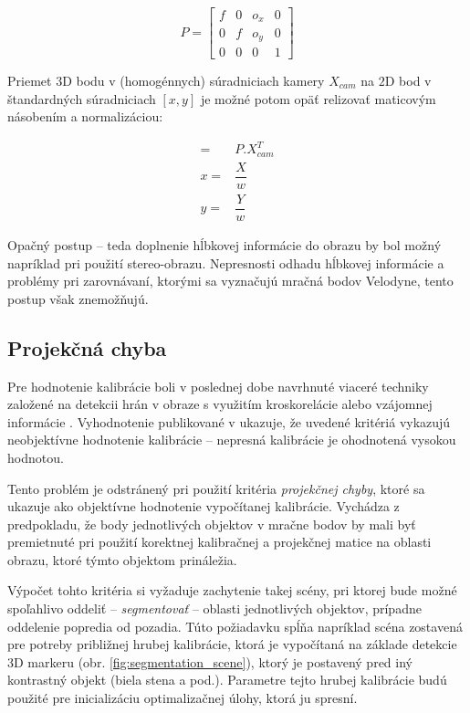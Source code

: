 \documentclass[12pt, a4paper]{article}
\begin{document}
\begin{equation}
P = \left[ 
      \begin{array}{cccc} 
	f & 0 & o_x & 0 \\
	0 & f & o_y & 0 \\ 
	0 & 0 & 0 & 1
      \end{array}
    \right]	\label{eq:projection}
\end{equation}

Priemet $3$D bodu v (homogénnych) súradniciach kamery $X_{cam}$ na $2$D bod v štandardných súradniciach $[x, y]$ je možné potom opäť relizovať maticovým násobením a normalizáciou:

\begin{eqnarray}
	[X,Y,w] =& P . X_{cam}^T \\
	x =& \dfrac{X}{w} \\
	y =& \dfrac{Y}{w}
\end{eqnarray}

Opačný postup -- teda doplnenie hĺbkovej informácie do obrazu by bol možný napríklad pri použití stereo-obrazu. Nepresnosti odhadu hĺbkovej informácie a problémy pri zarovnávaní, ktorými sa vyznačujú mračná bodov Velodyne, tento postup však znemožňujú. 

\subsection{Projekčná chyba}
Pre hodnotenie kalibrácie boli v poslednej dobe navrhnuté viaceré techniky založené na detekcii hrán v obraze s využitím kroskorelácie \cite{levinson} alebo vzájomnej informácie \cite{taylor}. Vyhodnotenie publikované v \cite{velas} ukazuje, že uvedené kritériá vykazujú neobjektívne hodnotenie kalibrácie -- nepresná kalibrácie je ohodnotená vysokou hodnotou.

Tento problém je odstránený pri použití kritéria \emph{projekčnej chyby}, ktoré sa ukazuje ako objektívne hodnotenie vypočítanej kalibrácie. Vychádza z predpokladu, že body jednotlivých objektov v mračne bodov by mali byť premietnuté pri použití korektnej kalibračnej a projekčnej matice na oblasti obrazu, ktoré týmto objektom prináležia.

Výpočet tohto kritéria si vyžaduje zachytenie takej scény, pri ktorej bude možné spoľahlivo oddeliť -- \emph{segmentovať} -- oblasti jednotlivých objektov, prípadne oddelenie popredia od pozadia. Túto požiadavku spĺňa napríklad scéna zostavená pre potreby približnej hrubej kalibrácie, ktorá je vypočítaná na základe detekcie $3$D markeru (obr. \ref{fig:segmentation_scene}), ktorý je postavený pred iný kontrastný objekt (biela stena a pod.). Parametre tejto hrubej kalibrácie budú použité pre inicializáciu optimalizačnej úlohy, ktorá ju spresní.
\end{document}
